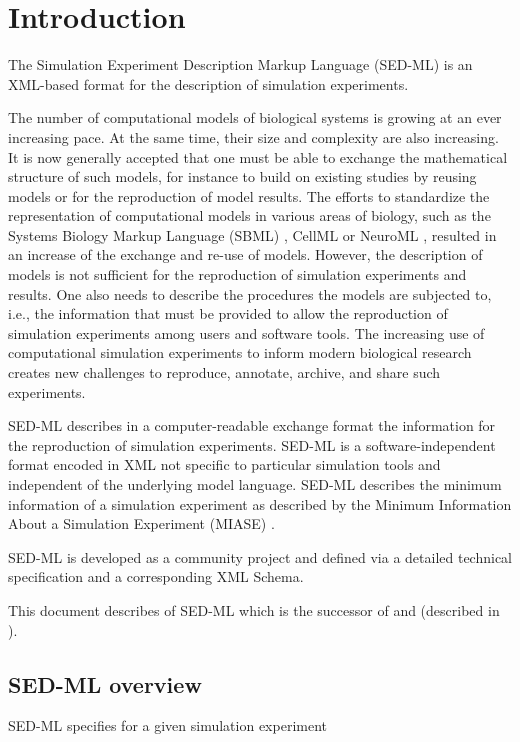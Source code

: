 \chapter{Introduction}
The Simulation Experiment Description Markup Language (SED-ML) is an XML-based format for the description of simulation experiments.

The number of computational models of biological systems is growing at an ever increasing pace. 
At the same time, their size and complexity are also increasing. It is now generally accepted that one must be able to exchange the mathematical structure of such models, for instance to build on existing studies by reusing models or for the reproduction of model results. The efforts to standardize the representation of computational models in various areas of biology, such as the Systems Biology Markup Language (SBML) \citep{Hucka:2003}, CellML \citep{cuellar:2003} or NeuroML \citep{Goddard:2001}, resulted in an increase of the exchange and re-use of models. However, the description of models is not sufficient for the reproduction of simulation experiments and results. One also needs to describe the procedures the models are subjected to, i.e., the information that must be provided to allow the reproduction of simulation experiments among users and software tools. The increasing use of computational simulation experiments to inform modern biological research creates new challenges to reproduce, annotate, archive, and share such experiments. 

SED-ML describes in a computer-readable exchange format the information for the reproduction of simulation experiments. SED-ML is a software-independent format encoded in XML not specific to particular simulation tools and independent of the underlying model language. SED-ML describes the minimum information of a simulation experiment as described by the Minimum Information About a Simulation Experiment (MIASE) \citep{Waltemath:2011}.

SED-ML is developed as a community project and defined via a detailed technical specification and a corresponding XML Schema. 

This document describes \currentLV of SED-ML which is the successor of \previousLV and \LoneVone (described in \citep{WAB+11}).

\section{SED-ML overview}
SED-ML specifies for a given simulation experiment

